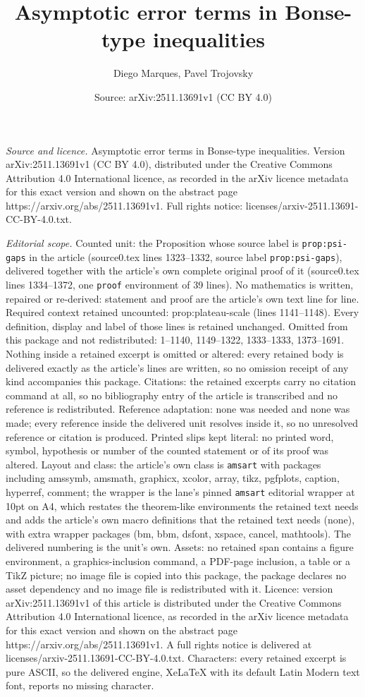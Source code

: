 \documentclass[10pt,a4paper]{amsart}
\title[Asymptotic error terms in Bonse-type inequalities]{Asymptotic error terms in Bonse-type inequalities}
\author{Diego Marques, Pavel Trojovsky}
\date{Source: arXiv:2511.13691v1 (CC BY 4.0)}
\begin{document}
\maketitle

\noindent\emph{Source and licence.} Asymptotic error terms in Bonse-type inequalities. Version arXiv:2511.13691v1 (CC BY 4.0), distributed under the Creative Commons Attribution 4.0 International licence, as recorded in the arXiv licence metadata for this exact version and shown on the abstract page https://arxiv.org/abs/2511.13691v1. Full rights notice: licenses/arxiv-2511.13691-CC-BY-4.0.txt.\par\smallskip

\noindent\textit{Editorial scope.} Counted unit: the Proposition whose source label is \texttt{prop:psi-gaps} in the article (source0.tex lines 1323--1332, source label \texttt{prop:psi-gaps}), delivered together with the article's own complete original proof of it (source0.tex lines 1334--1372, one \texttt{proof} environment of 39 lines). No mathematics is written, repaired or re-derived: statement and proof are the article's own text line for line. Required context retained uncounted: prop:plateau-scale (lines 1141--1148). Every definition, display and label of those lines is retained unchanged. Omitted from this package and not redistributed: 1--1140, 1149--1322, 1333--1333, 1373--1691. Nothing inside a retained excerpt is omitted or altered: every retained body is delivered exactly as the article's lines are written, so no omission receipt of any kind accompanies this package. Citations: the retained excerpts carry no citation command at all, so no bibliography entry of the article is transcribed and no reference is redistributed. Reference adaptation: none was needed and none was made; every reference inside the delivered unit resolves inside it, so no unresolved reference or citation is produced. Printed slips kept literal: no printed word, symbol, hypothesis or number of the counted statement or of its proof was altered. Layout and class: the article's own class is \texttt{amsart} with packages including amssymb, amsmath, graphicx, xcolor, array, tikz, pgfplots, caption, hyperref, comment; the wrapper is the lane's pinned \texttt{amsart} editorial wrapper at 10pt on A4, which restates the theorem-like environments the retained text needs and adds the article's own macro definitions that the retained text needs (none), with extra wrapper packages (bm, bbm, dsfont, xspace, cancel, mathtools). The delivered numbering is the unit's own. Assets: no retained span contains a figure environment, a graphics-inclusion command, a PDF-page inclusion, a table or a TikZ picture; no image file is copied into this package, the package declares no asset dependency and no image file is redistributed with it. Licence: version arXiv:2511.13691v1 of this article is distributed under the Creative Commons Attribution 4.0 International licence, as recorded in the arXiv licence metadata for this exact version and shown on the abstract page https://arxiv.org/abs/2511.13691v1. A full rights notice is delivered at licenses/arxiv-2511.13691-CC-BY-4.0.txt. Characters: every retained excerpt is pure ASCII, so the delivered engine, XeLaTeX with its default Latin Modern text font, reports no missing character.
\end{document}
